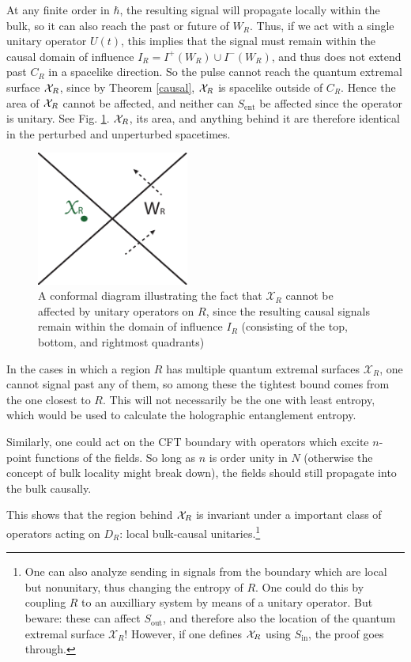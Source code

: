 \documentclass[12pt]{article}
\theoremstyle{remark}
\numberwithin{equation}{section}
\numberwithin{equation}{section}
\begin{document}
At any finite order in $\hbar$, the resulting signal will propagate locally within the bulk, so it can also reach the past or future of $W_R$.  Thus, if we act with a single unitary operator $U(t)$, this implies that the signal must remain within the causal domain of influence $I_R = I^+(W_R) \cup I^-(W_R)$, and thus does not extend past $C_R$ in a spacelike direction.  So the pulse cannot reach the quantum extremal surface ${\cal X}_R$, since by Theorem \ref{causal}, ${\cal X}_R$ is spacelike outside of $C_R$.  Hence the area of ${\cal X}_R$ cannot be affected, and neither can $S_\mathrm{ent}$ be affected since the operator is unitary.  See Fig. \ref{CausalSignal}.  ${\cal X}_R$, its area, and anything behind it are therefore identical in the perturbed and unperturbed spacetimes.

\begin{figure}[t]
\begin{center}
\includegraphics[width=5cm]{CausalSignalsv2.pdf} 
\caption{\small{A conformal diagram illustrating the fact that $\mathcal{X}_{R}$ cannot be affected by unitary operators on $R$, since the resulting causal signals remain within the domain of influence $I_R$ (consisting of the top, bottom, and rightmost quadrants)}}
\label{CausalSignal}
\end{center}
\end{figure}

In the cases in which a region $R$ has multiple quantum extremal surfaces ${\mathcal{X}_R}$, one cannot signal past any of them, so among these the tightest bound comes from the one closest to $R$.  This will not necessarily be the one with least entropy, which would be used to calculate the holographic entanglement entropy.  

Similarly, one could act on the CFT boundary with operators which excite $n$-point functions of the fields.  So long as $n$ is order unity in $N$ (otherwise the concept of bulk locality might break down), the fields should still propagate into the bulk causally.

This shows that the region behind ${\cal X}_R$ is invariant under a important class of operators acting on $D_R$: local bulk-causal unitaries.\footnote{One can also analyze sending in signals from the boundary which are local but nonunitary, thus changing the entropy of $R$.  One could do this by coupling $R$ to an auxilliary system by means of a unitary operator.  But beware: these can affect $S_\mathrm{out}$, and therefore also the location of the quantum extremal surface $\mathcal{X}_{R}$!  However, if one defines ${\cal X}_R$ using $S_\mathrm{in}$, the proof goes through.}  
\end{document}
